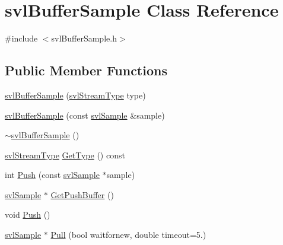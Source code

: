 \hypertarget{classsvl_buffer_sample}{\section{svl\-Buffer\-Sample Class Reference}
\label{classsvl_buffer_sample}
}


{\ttfamily \#include $<$svl\-Buffer\-Sample.\-h$>$}

\subsection*{Public Member Functions}
\begin{DoxyCompactItemize}
\item 
\hyperlink{classsvl_buffer_sample_ad2c9b17633a1a4ce9077f5741107b379}{svl\-Buffer\-Sample} (\hyperlink{svl_definitions_8h_aa00696d338a58db361335a01fd11e122}{svl\-Stream\-Type} type)
\item 
\hyperlink{classsvl_buffer_sample_adef693706c40294692cd56f98e94cb47}{svl\-Buffer\-Sample} (const \hyperlink{classsvl_sample}{svl\-Sample} \&sample)
\item 
\hyperlink{classsvl_buffer_sample_aa895b7c9775a76e960df4d56616e0998}{$\sim$svl\-Buffer\-Sample} ()
\item 
\hyperlink{svl_definitions_8h_aa00696d338a58db361335a01fd11e122}{svl\-Stream\-Type} \hyperlink{classsvl_buffer_sample_a98eeb89859fd8e9eb678fea1ab1a8d20}{Get\-Type} () const 
\item 
int \hyperlink{classsvl_buffer_sample_a80ad0e4ec9b1a58e8bc0980707ca761c}{Push} (const \hyperlink{classsvl_sample}{svl\-Sample} $\ast$sample)
\item 
\hyperlink{classsvl_sample}{svl\-Sample} $\ast$ \hyperlink{classsvl_buffer_sample_a0d76923009b81ad3e6639f5a8c3b9b42}{Get\-Push\-Buffer} ()
\item 
void \hyperlink{classsvl_buffer_sample_a9c9361afc2ad9809cdc84e210889c260}{Push} ()
\item 
\hyperlink{classsvl_sample}{svl\-Sample} $\ast$ \hyperlink{classsvl_buffer_sample_a9d033d97d1347fd0342401cdaa961b2c}{Pull} (bool waitfornew, double timeout=5.)
\end{DoxyCompactItemize}


